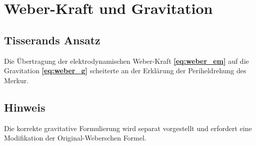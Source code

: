 \section{Weber-Kraft und Gravitation}

\subsection*{Tisserands Ansatz}
Die Übertragung der elektrodynamischen Weber-Kraft \textbf{\ref{eq:weber_em}} auf die Gravitation \textbf{\ref{eq:weber_g}} scheiterte
an der Erklärung der Periheldrehung des Merkur.

\subsection*{Hinweis}
Die korrekte gravitative Formulierung wird separat vorgestellt und erfordert eine Modifikation der Original-Weberschen Formel.
